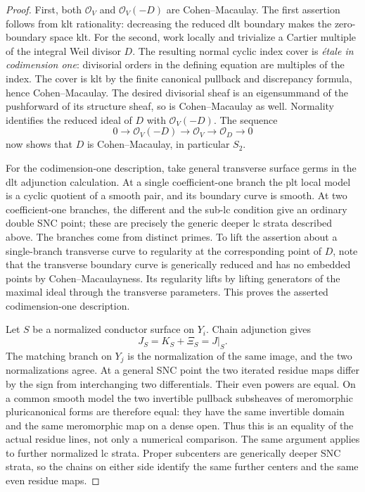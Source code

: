 \documentclass[11pt,letterpaper]{article}
\newcommand{\OO}{\mathcal{O}}
\theoremstyle{definition}
\theoremstyle{remark}
\begin{document}
\begin{proof}
First, both $\OO_V$ and $\OO_V(-D)$ are Cohen--Macaulay.  The first
assertion follows from klt rationality: decreasing the reduced dlt
boundary makes the zero-boundary space klt.  For the second, work
locally and trivialize a Cartier multiple of the integral Weil divisor
$D$.  The resulting normal cyclic index cover is \emph{\'etale in
codimension one}: divisorial orders in the defining equation are
multiples of the index.  The cover is klt by the finite canonical
pullback and discrepancy formula, hence Cohen--Macaulay.  The desired
divisorial sheaf is an eigensummand of the pushforward of its structure
sheaf, so is Cohen--Macaulay as well.  Normality identifies the reduced
ideal of $D$ with $\OO_V(-D)$.  The sequence
\[
 0\longrightarrow\OO_V(-D)\longrightarrow\OO_V
   \longrightarrow\OO_D\longrightarrow0
\]
now shows that $D$ is Cohen--Macaulay, in particular $S_2$.

For the codimension-one description, take general transverse surface
germs in the dlt adjunction calculation.  At a single coefficient-one
branch the plt local model is a cyclic quotient of a smooth pair, and
its boundary curve is smooth.  At two coefficient-one branches, the
different and the sub-lc condition give an ordinary double SNC point;
these are precisely the generic deeper lc strata described above.  The
branches come from distinct primes.  To lift the assertion about a
single-branch transverse curve to regularity at the corresponding
point of $D$, note that the transverse boundary curve is generically
reduced and has no embedded points by Cohen--Macaulayness.  Its
regularity lifts by lifting generators of the maximal ideal through
the transverse parameters.  This proves the asserted codimension-one
description.

Let $S$ be a normalized conductor surface on $Y_i$.  Chain adjunction
gives
\begin{equation}
 \label{floor:surface-adjunction}
 J_S=K_S+\Xi_S=J|_S.
\end{equation}
The matching branch on $Y_j$ is the normalization of the same image,
and the two normalizations agree.  At a general SNC point the two
iterated residue maps differ by the sign from interchanging two
differentials.  Their even powers are equal.  On a common smooth model
the two invertible pullback subsheaves of meromorphic pluricanonical
forms are therefore equal: they have the same invertible domain and
the same meromorphic map on a dense open.  Thus this is an equality of
the actual residue lines, not only a numerical comparison.  The same
argument applies to further normalized lc strata.  Proper subcenters
are generically deeper SNC strata, so the chains on either side
identify the same further centers and the same even residue maps.


\end{proof}
\end{document}
